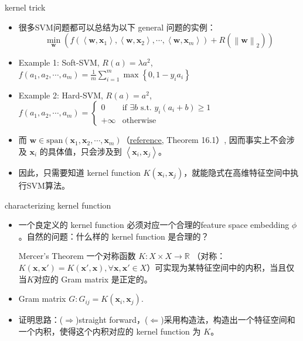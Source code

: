 \begin{frame}[fragile]{kernel trick}
    \begin{itemize}
        \item 很多SVM问题都可以总结为以下 general 问题的实例：
        \[
           \min_{\mathbf{w}} \left( f(\left\langle \mathbf{w}, \mathbf{x}_1 \right\rangle, \left\langle \mathbf{w}, \mathbf{x}_2 \right\rangle, \cdots, \left\langle \mathbf{w}, \mathbf{x}_m \right\rangle ) + R(\left\| \mathbf{w} \right\|_2 )\right) 
        \]
        \item Example 1: Soft-SVM, $R(a) = \lambda a^{2}$, $f(a_1, a_2, \cdots, a_m) = \frac{1}{m} \sum_{i=1}^{m}\max \left\{ 0, 1-y_i a_i \right\} $
        \item Example 2: Hard-SVM, $R(a) = a^{2}$, $f(a_1, a_2, \cdots, a_m) = \begin{cases} 0 & \text{if } \exists  b \text{ s.t. } y_i (a_i+b) \geqslant 1 \\ +\infty & \text{otherwise} \end{cases} $
        \item 而 $\mathbf{w} \in \text{span}(\mathbf{x}_1, \mathbf{x}_2, \cdots, \mathbf{x}_m)$（\href{https://www.cs.huji.ac.il/w~shais/UnderstandingMachineLearning/understanding-machine-learning-theory-algorithms.pdf}{\underline{reference}}, Theorem 16.1）, 因而事实上不会涉及 $\mathbf{x}_i$ 的具体值，只会涉及到 $\left\langle \mathbf{x}_i, \mathbf{x}_j \right\rangle$。
        \item 因此，只需要知道 kernel function $K(\mathbf{x}_i, \mathbf{x}_j)$，就能隐式在高维特征空间中执行SVM算法。
    \end{itemize}
\end{frame}

\begin{frame}[fragile]{characterizing kernel function}
    \begin{itemize}
        \item 一个良定义的 kernel function 必须对应一个合理的feature space embedding $\phi$。自然的问题：什么样的 kernel function 是合理的？
        \begin{block}{Mercer's Theorem}
            一个对称函数 $K:X\times X \to \mathbb{R}$ （对称：$K(\mathbf{x}, \mathbf{x'}) = K(\mathbf{x'}, \mathbf{x}), \forall \mathbf{x}, \mathbf{x'} \in X$）可实现为某特征空间中的内积，当且仅当$K$对应的 Gram matrix 是正定的。
        \end{block}
        \item Gram matrix $G: G_{ij} = K(\mathbf{x}_i, \mathbf{x}_j)$.
        \item 证明思路：($\Rightarrow $)straight forward，($\Leftarrow $)采用构造法，构造出一个特征空间和一个内积，使得这个内积对应的 kernel function 为 $K$。
    \end{itemize}

\end{frame}
